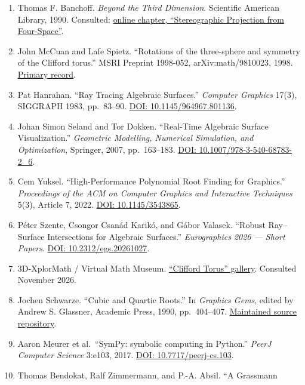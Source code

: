 \documentclass[11pt,a4paper]{article}
\providecommand{\tightlist}{\setlength{\itemsep}{0pt}\setlength{\parskip}{0pt}}
\begin{document}
\begin{enumerate}
\def\labelenumi{\arabic{enumi}.}
\tightlist
\item
  Thomas F. Banchoff. \emph{Beyond the Third Dimension}. Scientific
  American Library, 1990. Consulted:
  \href{https://www.math.brown.edu/tbanchof/Beyond3D.new/chapter6/s6_8.html}{online
  chapter, ``Stereographic Projection from Four-Space''}.
\item
  John McCuan and Lafe Spietz. ``Rotations of the three-sphere and
  symmetry of the Clifford torus.'' MSRI Preprint 1998-052,
  arXiv:math/9810023, 1998.
  \href{https://arxiv.org/abs/math/9810023}{Primary record}.
\item
  Pat Hanrahan. ``Ray Tracing Algebraic Surfaces.'' \emph{Computer
  Graphics} 17(3), SIGGRAPH 1983, pp.~83--90.
  \href{https://doi.org/10.1145/964967.801136}{DOI:
  10.1145/964967.801136}.
\item
  Johan Simon Seland and Tor Dokken. ``Real-Time Algebraic Surface
  Visualization.'' \emph{Geometric Modelling, Numerical Simulation, and
  Optimization}, Springer, 2007, pp.~163--183.
  \href{https://doi.org/10.1007/978-3-540-68783-2_6}{DOI:
  10.1007/978-3-540-68783-2\_6}.
\item
  Cem Yuksel. ``High-Performance Polynomial Root Finding for Graphics.''
  \emph{Proceedings of the ACM on Computer Graphics and Interactive
  Techniques} 5(3), Article 7, 2022.
  \href{https://doi.org/10.1145/3543865}{DOI: 10.1145/3543865}.
\item
  Péter Szente, Csongor Csanád Karikó, and Gábor Valasek. ``Robust
  Ray--Surface Intersections for Algebraic Surfaces.''
  \emph{Eurographics 2026 --- Short Papers}.
  \href{https://doi.org/10.2312/egs.20261027}{DOI:
  10.2312/egs.20261027}.
\item
  3D-XplorMath / Virtual Math Museum.
  \href{https://webapps.math.uci.edu/~vmm/Surface/clifford_torus/clifford_torus.html}{``Clifford
  Torus'' gallery}. Consulted November 2026.
\item
  Jochen Schwarze. ``Cubic and Quartic Roots.'' In \emph{Graphics Gems},
  edited by Andrew S. Glassner, Academic Press, 1990, pp.~404--407.
  \href{https://github.com/erich666/GraphicsGems/blob/master/gems/Roots3And4.c}{Maintained
  source repository}.
\item
  Aaron Meurer et al.~``SymPy: symbolic computing in Python.''
  \emph{PeerJ Computer Science} 3:e103, 2017.
  \href{https://doi.org/10.7717/peerj-cs.103}{DOI:
  10.7717/peerj-cs.103}.
\item
  Thomas Bendokat, Ralf Zimmermann, and P.-A. Absil. ``A Grassmann

\end{enumerate}
\end{document}
